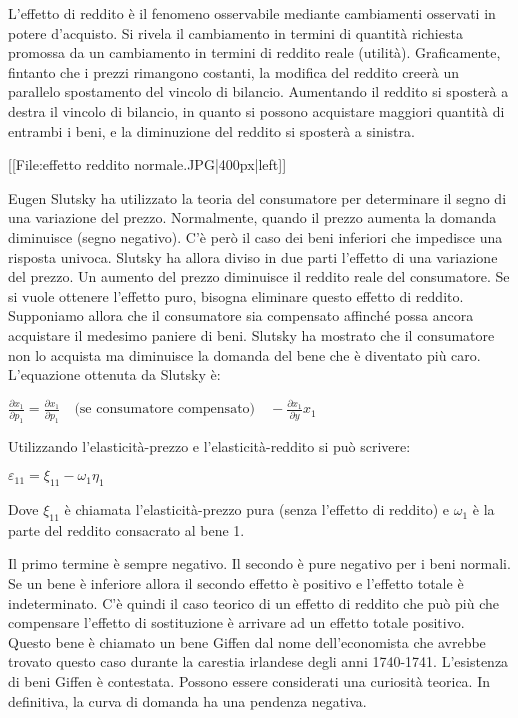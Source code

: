 L'effetto di reddito è il fenomeno osservabile mediante cambiamenti osservati 
in potere d'acquisto. Si rivela il cambiamento in termini di quantità richiesta 
promossa da un cambiamento in termini di reddito reale (utilità). Graficamente, 
fintanto che i prezzi rimangono costanti, la modifica del reddito creerà un 
parallelo spostamento del vincolo di bilancio. 
Aumentando il reddito si sposterà a destra il vincolo di bilancio, in quanto si 
possono acquistare maggiori quantità di entrambi i beni, e la diminuzione del 
reddito si sposterà a sinistra.

[[File:effetto reddito normale.JPG|400px|left]]

Eugen Slutsky ha utilizzato la teoria del consumatore per determinare il segno 
di una variazione del prezzo. 
Normalmente, 
quando il prezzo aumenta la domanda diminuisce (segno negativo). C'è però il 
caso dei beni inferiori che impedisce una risposta univoca. Slutsky ha allora 
diviso in due parti l'effetto di una variazione del prezzo. Un aumento del 
prezzo diminuisce il reddito reale del consumatore. Se si vuole ottenere 
l'effetto puro, bisogna eliminare questo effetto di reddito. Supponiamo allora 
che il consumatore sia compensato affinché possa ancora acquistare il medesimo 
paniere di beni. Slutsky ha mostrato che il consumatore non lo acquista ma 
diminuisce la domanda del bene che è diventato più caro. L'equazione ottenuta 
da Slutsky è:

\(\frac{\partial x_1}{\partial p_1} = \frac{\partial x_1}{\partial p_1} 
\quad \text{(se consumatore compensato)} \quad - \frac{\partial x_1}{\partial 
y} x_1 \)

Utilizzando l'elasticità-prezzo e l'elasticità-reddito si può scrivere:

\( \varepsilon_{11} = \xi_{11} - \omega_1 \eta_1  \)

Dove \( \xi_{11} \) è chiamata l'elasticità-prezzo pura (senza 
l'effetto di reddito) e \( \omega_1 \) è la parte del reddito 
consacrato al bene 1.

Il primo termine è sempre negativo. Il secondo è pure negativo per i beni 
normali. Se un bene è inferiore allora il secondo effetto è positivo e 
l'effetto totale è indeterminato. 
C'è quindi il caso teorico di un effetto di reddito che 
può più che compensare l'effetto di sostituzione è arrivare ad un effetto 
totale positivo. 
Questo bene è chiamato un bene Giffen dal nome dell'economista che 
avrebbe trovato questo caso durante la carestia irlandese degli anni 1740-1741. 
L'esistenza di beni Giffen è contestata. Possono essere considerati una 
curiosità teorica. In definitiva, la curva di domanda ha una pendenza 
negativa.

